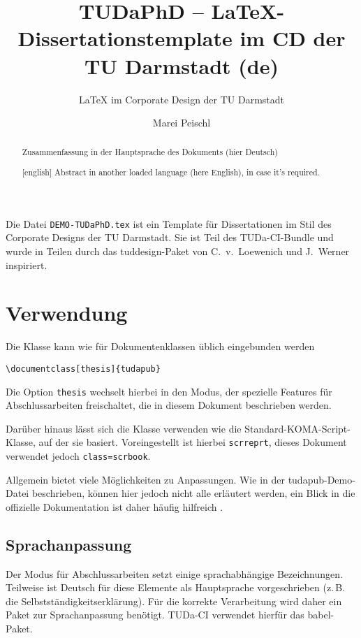 \documentclass[
	german,%
	accentcolor=9c,%
	ruledheaders=chapter,%
	class=book,%
	thesis={%
			type=dr,
			dr=rernat
		},
	fontsize=11pt,%
	parskip=half-,%
	custommargins=true,%
	marginpar=false,%
]{tudapub}
\title{TUDaPhD -- \LaTeX-Dissertationstemplate im CD der TU Darmstadt (de)}
\subtitle{\LaTeX{} im Corporate Design der TU Darmstadt}
\author{Marei Peischl}
\institute{Institut}
\newcommand*{\file}[1]{\texttt{#1}}
\newcommand*{\code}[1]{\texttt{#1}}
\begin{document}
\frontmatter

\maketitle

\affidavit%
\begin{abstract}
	Zusammenfassung in der Hauptsprache des Dokuments (hier Deutsch)
\end{abstract}

\begin{abstract}[english]
	Abstract in another loaded language (here English), in case it's required.
\end{abstract}

\tableofcontents

\mainmatter


Die Datei \file{DEMO-TUDaPhD.tex} ist ein Template für Dissertationen im Stil des Corporate Designs der TU Darmstadt.
Sie ist Teil des TUDa-CI-Bundle und wurde in Teilen durch das tuddesign-Paket von C.~v.~Loewenich und J.~Werner inspiriert.


\chapter{Verwendung}
Die Klasse kann wie für Dokumentenklassen üblich eingebunden werden
\begin{verbatim}
\documentclass[thesis]{tudapub}
\end{verbatim}
Die Option \code{thesis} wechselt hierbei in den Modus, der spezielle Features für Abschlussarbeiten freischaltet, die in diesem Dokument beschrieben werden.

Darüber hinaus lässt sich die Klasse verwenden wie die Standard-KOMA-Script-Klasse, auf der sie basiert.
Voreingestellt ist hierbei \code{scrreprt}, dieses Dokument verwendet jedoch \code{class=scrbook}.

Allgemein bietet \KOMAScript{} viele Möglichkeiten zu Anpassungen. Wie in der tudapub-Demo-Datei beschrieben, können hier jedoch nicht alle erläutert werden, ein Blick in die offizielle Dokumentation ist daher häufig hilfreich \cite{scrguide}.

\section{Sprachanpassung}
Der Modus für Abschlussarbeiten setzt einige sprachabhängige Bezeichnungen.
Teilweise ist Deutsch für diese Elemente als Hauptsprache vorgeschrieben (z.\,B. die Selbstständigkeitserklärung). Für die korrekte Verarbeitung wird daher ein Paket zur Sprachanpassung benötigt.
TUDa-CI verwendet hierfür das babel-Paket.
\end{document}
